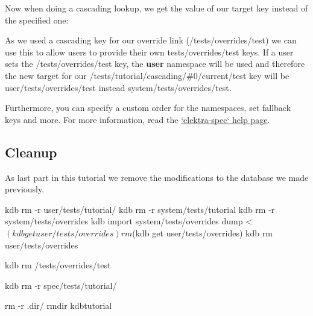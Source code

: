 

Now when doing a cascading lookup, we get the value of our target key instead of the specified one\+:




As we used a cascading key for our override link ({\ttfamily /tests/overrides/test}) we can use this to allow users to provide their own {\ttfamily tests/overrides/test} keys. If a user sets the {\ttfamily /tests/overrides/test} key, the {\bfseries user} namespace will be used and therefore the new target for our {\ttfamily /tests/tutorial/cascading/\#0/current/test} key will be {\ttfamily user/tests/overrides/test} instead {\ttfamily system/tests/overrides/test}.




Furthermore, you can specify a custom order for the namespaces, set fallback keys and more. For more information, read the \hyperlink{md_doc_help_elektra-spec_doc_help_elektra-spec_md}{`elektra-\/spec` help page}.

\subsection*{Cleanup}

As last part in this tutorial we remove the modifications to the database we made previously.


\begin{DoxyCode}
kdb rm -r user/tests/tutorial/
kdb rm -r system/tests/tutorial
kdb rm -r system/tests/overrides
kdb import system/tests/overrides dump < $(kdb get user/tests/overrides)
rm $(kdb get user/tests/overrides)
kdb rm user/tests/overrides

kdb rm /tests/overrides/test

kdb rm -r spec/tests/tutorial/

rm -r .dir/
rmdir kdbtutorial
\end{DoxyCode}
 
